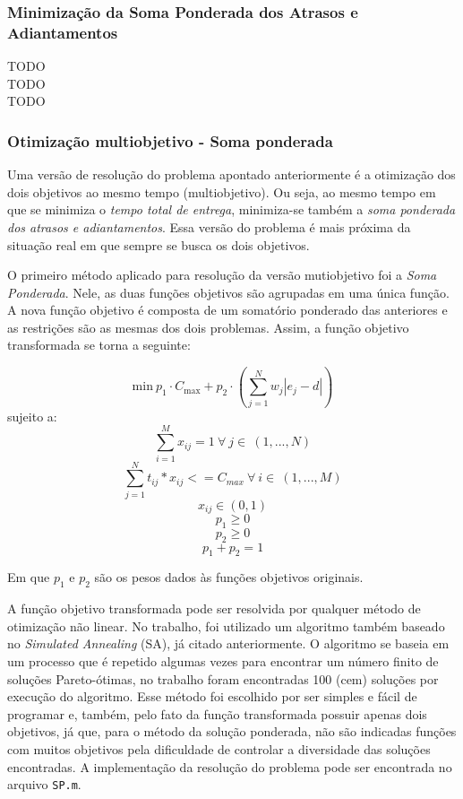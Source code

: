 \documentclass[conference]{IEEEtran}
\begin{document}
\subsubsection{Minimização da Soma Ponderada dos Atrasos e Adiantamentos}
TODO
\\
TODO
\\TODO
\subsubsection{Otimização multiobjetivo - Soma ponderada}
Uma versão de resolução do problema apontado anteriormente é a otimização dos dois objetivos ao mesmo tempo (multiobjetivo). Ou seja, ao mesmo tempo em que se minimiza o \emph{tempo total de entrega}, minimiza-se também a \emph{soma ponderada dos atrasos e adiantamentos}. Essa versão do problema é mais próxima da situação real em que sempre se busca os dois objetivos.

O primeiro método  aplicado para resolução da versão mutiobjetivo foi a \emph{Soma Ponderada}. Nele, as duas funções objetivos são agrupadas em uma única função. A nova função objetivo é composta de um somatório ponderado das anteriores e as restrições são as mesmas dos dois problemas. Assim, a função objetivo transformada se torna a seguinte:

\[\mathrm{min}\ p_1 \cdot C_{\mathrm{max}} + p_2 \cdot \left( \sum_{j=1}^{N}w_j|e_j-d| \right)\]
sujeito a:
\begin{equation}
\sum_{i=1}^{M}x_{ij}=1\ \forall\ j \in\ (1,...,N)
\label{eq:rest4}
\end{equation}
\begin{equation}
\sum_{j=1}^{N}t_{ij}*x_{ij} <= C_{max}\ \forall\ i \in\
(1,...,M)
\label{eq:rest5}
\end{equation}
\[x_{ij} \in (0, 1)\]
\[p_1 \ge 0\]
\[p_2 \ge 0\]
\[p_1 + p_2 = 1\]

Em que $p_1$ e $p_2$ são os pesos dados às funções objetivos originais.

A função objetivo transformada pode ser resolvida por qualquer método de otimização não linear. No trabalho, foi utilizado um algoritmo também baseado no \emph{Simulated Annealing} (SA), já citado anteriormente. O algoritmo se baseia em um processo que é repetido algumas vezes para encontrar um número finito de soluções Pareto-ótimas, no trabalho foram encontradas 100 (cem) soluções por execução do algoritmo. Esse método foi escolhido por ser simples e fácil de programar e, também, pelo fato da função transformada possuir apenas dois objetivos, já que, para o método da solução ponderada, não são indicadas funções com muitos objetivos pela dificuldade de controlar a diversidade das soluções encontradas. A implementação da resolução do problema pode ser encontrada no arquivo \texttt{SP.m}.
\end{document}
